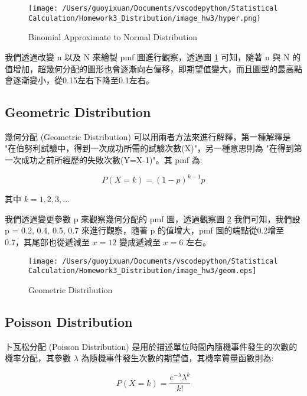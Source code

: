 \begin{figure}[H]
    \centering
        \texttt{[image: /Users/guoyixuan/Documents/vscodepython/Statistical Calculation/Homework3\_Distribution/image\_hw3/hyper.png]}
    \caption{Binomial Approximate to Normal Distribution}
    \label{fig:Hypergeometric Distribution}
\end{figure}

我們透過改變 n 以及 N 來繪製 pmf 圖進行觀察，透過圖 \ref{fig:Hypergeometric Distribution} 可知，隨著 n 與 N 的值增加，超幾何分配的圖形也會逐漸向右偏移，即期望值變大，而且圖型的最高點會逐漸變小，從0.15左右下降至0.1左右。

\subsection{Geometric Distribution}
幾何分配 (Geometric Distribution) 可以用兩者方法來進行解釋，第一種解釋是 "在伯努利試驗中，得到一次成功所需的試驗次數(X)"，另一種意思則為 "在得到第一次成功之前所經歷的失敗次數(Y=X-1)"。其 pmf 為:

\begin{equation}
P(X=k)=(1-p)^{k-1}p
\end{equation}

其中 $k = 1,2,3,...$

我們透過變更參數 p 來觀察幾何分配的 pmf 圖，透過觀察圖 \ref{fig:Geometric Distribution} 我們可知，我們設 p = 0.2, 0.4, 0.5, 0.7 來進行觀察，隨著 p 的值增大，pmf 圖的端點從0.2增至0.7，其尾部也從遞減至 $x=12$ 變成遞減至 $x=6$ 左右。

\begin{figure}[H]
    \centering
        \texttt{[image: /Users/guoyixuan/Documents/vscodepython/Statistical Calculation/Homework3\_Distribution/image\_hw3/geom.eps]}
    \caption{Geometric Distribution}
    \label{fig:Geometric Distribution}
\end{figure}


\subsection{Poisson Distribution}

卜瓦松分配 (Poisson Distribution) 是用於描述單位時間內隨機事件發生的次數的機率分配，其參數 $\lambda$ 為隨機事件發生次數的期望值，其機率質量函數則為:

\begin{equation}
P(X=k)=\frac{e^{-\lambda}\lambda^k}{k!}
\end{equation}

